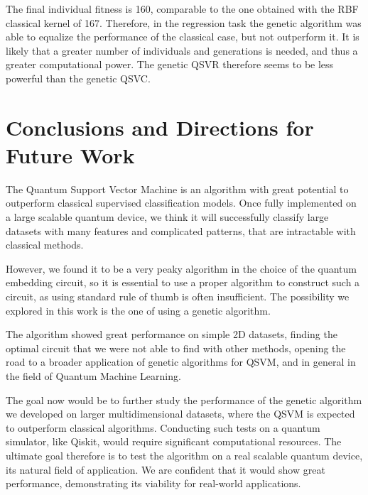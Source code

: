 \documentclass[12pt]{article}
\begin{document}
The final individual fitness is 160, comparable to the one obtained with the RBF classical kernel of 167. Therefore, in the regression task the genetic algorithm was able to equalize the performance of the classical case, but not outperform it. It is likely that a greater number of individuals and generations is needed, and thus a greater computational power. The genetic QSVR therefore seems to be less powerful than the genetic QSVC. 

\newpage 
\section{Conclusions and Directions for Future Work}

The Quantum Support Vector Machine is an algorithm with great potential to outperform classical supervised classification models. Once fully implemented on a large scalable quantum device, we think it will successfully classify large datasets with many features and complicated patterns, that are intractable with classical methods. 

However, we found it to be a very peaky algorithm in the choice of the quantum embedding circuit, so it is essential to use a proper algorithm to construct such a circuit, as using standard rule of thumb is often insufficient. The possibility we explored in this work is the one of using a genetic algorithm. 

The algorithm showed great performance on simple 2D datasets, finding the optimal circuit that we were not able to find with other methods, opening the road to a broader application of genetic algorithms for QSVM, and in general in the field of Quantum Machine Learning. 

The goal now would be to further study the performance of the genetic algorithm we developed on larger multidimensional datasets, where the QSVM is expected to outperform classical algorithms. Conducting such tests on a quantum simulator, like Qiskit, would require significant computational resources. The ultimate goal therefore is to test the algorithm on a real scalable quantum device, its natural field of application. We are confident that it would show great performance, demonstrating its viability for real-world applications.


\newpage
\end{document}
